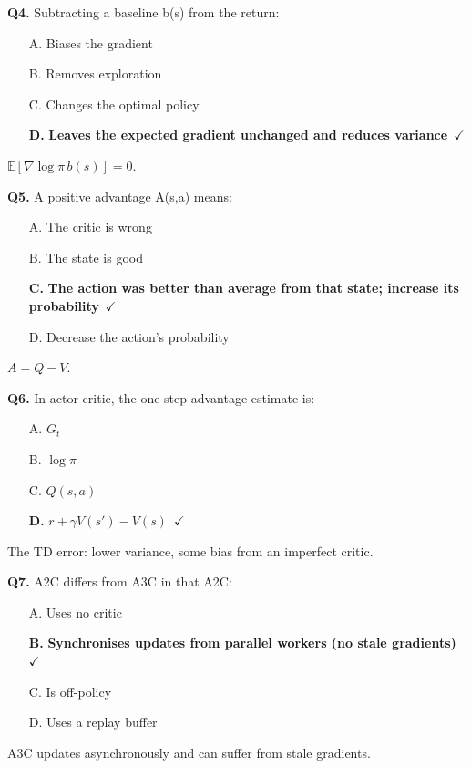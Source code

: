 \documentclass[11pt]{article}
\begin{document}
{\noindent\textbf{Q4.} Subtracting a baseline b(s) from the return:\begin{itemize}[leftmargin=2.2em,itemsep=0pt,topsep=1pt]\item[A.] Biases the gradient\item[B.] Removes exploration\item[C.] Changes the optimal policy\item[\textbf{D.}] \textbf{Leaves the expected gradient unchanged and reduces variance}~{\color{GrnN}$\checkmark$}\end{itemize} $\mathbb E[\nabla\log\pi\,b(s)]=0$.\par\medskip

\noindent\textbf{Q5.} A positive advantage A(s,a) means:\begin{itemize}[leftmargin=2.2em,itemsep=0pt,topsep=1pt]\item[A.] The critic is wrong\item[B.] The state is good\item[\textbf{C.}] \textbf{The action was better than average from that state; increase its probability}~{\color{GrnN}$\checkmark$}\item[D.] Decrease the action's probability\end{itemize} $A=Q-V$.\par\medskip

\noindent\textbf{Q6.} In actor-critic, the one-step advantage estimate is:\begin{itemize}[leftmargin=2.2em,itemsep=0pt,topsep=1pt]\item[A.] $G_t$\item[B.] $\log\pi$\item[C.] $Q(s,a)$\item[\textbf{D.}] \textbf{$r+\gamma V(s')-V(s)$}~{\color{GrnN}$\checkmark$}\end{itemize} The TD error: lower variance, some bias from an imperfect critic.\par\medskip

\noindent\textbf{Q7.} A2C differs from A3C in that A2C:\begin{itemize}[leftmargin=2.2em,itemsep=0pt,topsep=1pt]\item[A.] Uses no critic\item[\textbf{B.}] \textbf{Synchronises updates from parallel workers (no stale gradients)}~{\color{GrnN}$\checkmark$}\item[C.] Is off-policy\item[D.] Uses a replay buffer\end{itemize} A3C updates asynchronously and can suffer from stale gradients.\par\medskip

}
\end{document}
